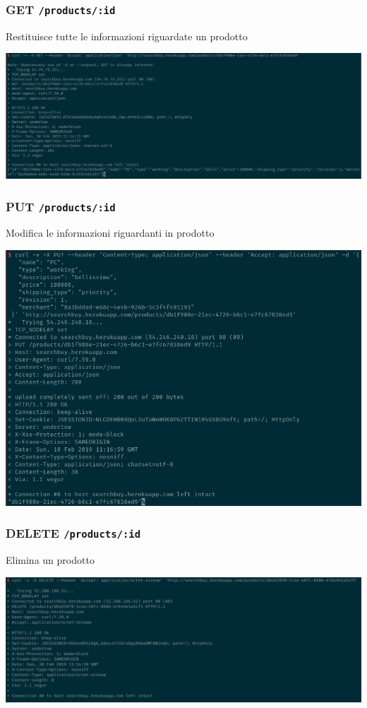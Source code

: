 \documentclass[11pt]{article}
\begin{document}
\subsubsection{GET \texttt{/products/:id}}
\label{sec:org223c125}
Restituisce tutte le informazioni riguardate un prodotto
\begin{center}
\includegraphics[width=.9\linewidth]{img/products-screen/get-product.png}
\end{center}
\subsubsection{PUT \texttt{/products/:id}}
\label{sec:org20c6544}
Modifica le informazioni riguardanti in prodotto
\begin{center}
\includegraphics[width=.9\linewidth]{img/products-screen/put-product.png}
\end{center}
\subsubsection{DELETE \texttt{/products/:id}}
\label{sec:org871b24f}
Elimina un prodotto
\begin{center}
\includegraphics[width=.9\linewidth]{img/products-screen/delete-product.png}
\end{center}
\end{document}
